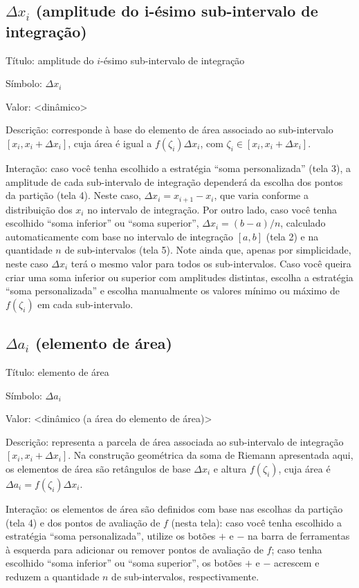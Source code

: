 \documentclass[a4paper,10pt]{scrartcl}
\newcommand\subintervalo{\ensuremath{[x_i, x_i + \Delta x_i]}}
\begin{document}
  \subsection*{$\Delta x_i$ (amplitude do i-ésimo sub-intervalo de integração)}
    \begin{compactdesc}
      \item{Título:} amplitude do $i$-ésimo sub-intervalo de integração
      \item{Símbolo:} $\Delta x_i$
      \item{Valor:} <dinâmico>
      \item{Descrição:} corresponde à base do elemento de área associado ao sub-intervalo \subintervalo, cuja área é igual a $f(\zeta_i)\Delta x_i$, com $\zeta_i \in \subintervalo$.
      \item{Interação:} caso você tenha escolhido a estratégia ``soma personalizada'' (tela 3), a amplitude de cada sub-intervalo de integração dependerá da escolha dos pontos da partição (tela 4). Neste caso, $\Delta x_i = x_{i+1} - x_i$, que varia conforme a distribuição dos $x_i$ no intervalo de integração. Por outro lado, caso você tenha escolhido ``soma inferior'' ou ``soma superior'', $\Delta x_i = (b - a)/n$, calculado automaticamente com base no intervalo de integração $[a,b]$ (tela 2) e na quantidade $n$ de sub-intervalos (tela 5). Note ainda que, apenas por simplicidade, neste caso $\Delta x_i$ terá o mesmo valor para todos os sub-intervalos. Caso você queira criar uma soma inferior ou superior com amplitudes distintas, escolha a estratégia ``soma personalizada'' e escolha manualmente os valores mínimo ou máximo de $f(\zeta_i)$ em cada sub-intervalo.
    \end{compactdesc}
   
    \newpage
    
  \subsection*{$\Delta a_i$ (elemento de área)}
    \begin{compactdesc}
	\item{Título:} elemento de área
	\item{Símbolo:} $\Delta a_i$
	\item{Valor:} <dinâmico (a área do elemento de área)>
	\item{Descrição:} representa a parcela de área associada ao sub-intervalo de integração \subintervalo. Na construção geométrica da soma de Riemann apresentada aqui, os elementos de área são retângulos de base $\Delta x_i$ e altura $f(\zeta_i)$, cuja área é $\Delta a_i = f(\zeta_i) \Delta x_i$.
	\item{Interação:} os elementos de área são definidos com base nas escolhas da partição (tela 4) e dos pontos de avaliação de $f$ (nesta tela): caso você tenha escolhido a estratégia ``soma personalizada'', utilize os botões $+$ e $-$ na barra de ferramentas à esquerda para adicionar ou remover pontos de avaliação de $f$; caso tenha escolhido ``soma inferior'' ou ``soma superior'', os botões $+$ e $-$ acrescem e reduzem a quantidade $n$ de sub-intervalos, respectivamente.
    \end{compactdesc}
	
\end{document}
